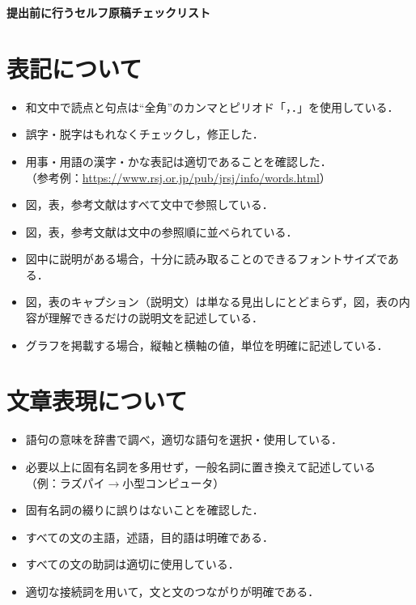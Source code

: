 \documentclass[a4paper,11pt,dvipdfmx]{jlreq}
\begin{document}
\begin{center}
\textbf{\Large
提出前に行うセルフ原稿チェックリスト %
}
\normalsize
\end{center}

\pagestyle{fancy}


\renewcommand{\labelitemi}{$\Box$}
\section{表記について}
\begin{itemize}
 \item 和文中で読点と句点は``全角''のカンマとピリオド「，．」を使用している．
 \item 誤字・脱字はもれなくチェックし，修正した．
 \item 用事・用語の漢字・かな表記は適切であることを確認した．\\
（参考例：\url{https://www.rsj.or.jp/pub/jrsj/info/words.html}）
 \item 図，表，参考文献はすべて文中で参照している．
 \item 図，表，参考文献は文中の参照順に並べられている．
 \item 図中に説明がある場合，十分に読み取ることのできるフォントサイズである．
 \item 図，表のキャプション（説明文）は単なる見出しにとどまらず，図，表の内容が理解できるだけの説明文を記述している．
 \item グラフを掲載する場合，縦軸と横軸の値，単位を明確に記述している．
 \end{itemize}

\section{文章表現について}
\begin{itemize}
 \item 語句の意味を辞書で調べ，適切な語句を選択・使用している．
 \item 必要以上に固有名詞を多用せず，一般名詞に置き換えて記述している\\ 
（例：ラズパイ$\rightarrow$小型コンピュータ）
 \item 固有名詞の綴りに誤りはないことを確認した．
 \item すべての文の主語，述語，目的語は明確である．
 \item すべての文の助詞は適切に使用している．
 \item 適切な接続詞を用いて，文と文のつながりが明確である．
\end{itemize}
\end{document}
